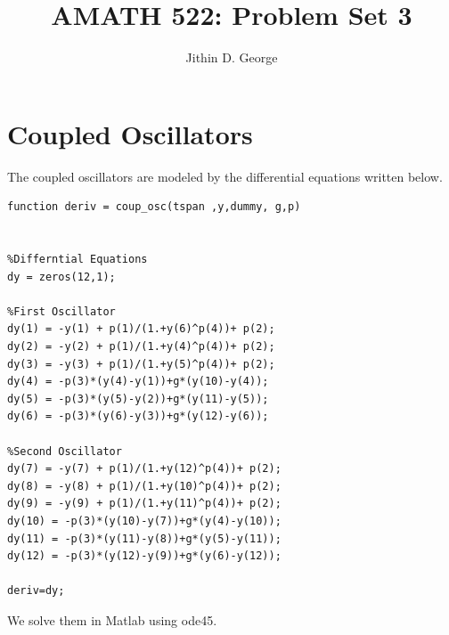 \documentclass[a4paper]{article}
\title{AMATH 522: Problem Set 3}
\author{Jithin D. George}
\begin{document}
\maketitle
\section{Coupled Oscillators}
The coupled oscillators are modeled by the differential equations written below.
\begin{lstlisting}[style=MyMatlabstyle]
function deriv = coup_osc(tspan ,y,dummy, g,p)


%Differntial Equations
dy = zeros(12,1);

%First Oscillator
dy(1) = -y(1) + p(1)/(1.+y(6)^p(4))+ p(2);
dy(2) = -y(2) + p(1)/(1.+y(4)^p(4))+ p(2);
dy(3) = -y(3) + p(1)/(1.+y(5)^p(4))+ p(2);
dy(4) = -p(3)*(y(4)-y(1))+g*(y(10)-y(4));
dy(5) = -p(3)*(y(5)-y(2))+g*(y(11)-y(5));
dy(6) = -p(3)*(y(6)-y(3))+g*(y(12)-y(6));

%Second Oscillator
dy(7) = -y(7) + p(1)/(1.+y(12)^p(4))+ p(2);
dy(8) = -y(8) + p(1)/(1.+y(10)^p(4))+ p(2);
dy(9) = -y(9) + p(1)/(1.+y(11)^p(4))+ p(2);
dy(10) = -p(3)*(y(10)-y(7))+g*(y(4)-y(10));
dy(11) = -p(3)*(y(11)-y(8))+g*(y(5)-y(11));
dy(12) = -p(3)*(y(12)-y(9))+g*(y(6)-y(12));

deriv=dy;
\end{lstlisting}
We solve them in Matlab using ode45.
\end{document}
